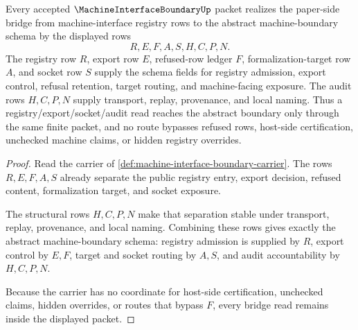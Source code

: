 \begin{theorem}
\label{thm:machine-interface-boundary-paper-bridge}
Every accepted $\MachineInterfaceBoundaryUp$ packet realizes the paper-side bridge from machine-interface registry rows to the abstract machine-boundary schema by the displayed rows
$$
R,E,F,A,S,H,C,P,N .
$$
The registry row $R$, export row $E$, refused-row ledger $F$, formalization-target row $A$, and socket row $S$ supply the schema fields for registry admission, export control, refusal retention, target routing, and machine-facing exposure. The audit rows $H,C,P,N$ supply transport, replay, provenance, and local naming. Thus a registry/export/socket/audit read reaches the abstract boundary only through the same finite packet, and no route bypasses refused rows, host-side certification, unchecked machine claims, or hidden registry overrides.
\end{theorem}
\begin{proof}
Read the carrier of \autoref{def:machine-interface-boundary-carrier}. The rows $R,E,F,A,S$ already separate the public registry entry, export decision, refused content, formalization target, and socket exposure.

The structural rows $H,C,P,N$ make that separation stable under transport, replay, provenance, and local naming. Combining these rows gives exactly the abstract machine-boundary schema: registry admission is supplied by $R$, export control by $E,F$, target and socket routing by $A,S$, and audit accountability by $H,C,P,N$.

Because the carrier has no coordinate for host-side certification, unchecked claims, hidden overrides, or routes that bypass $F$, every bridge read remains inside the displayed packet.
\end{proof}


